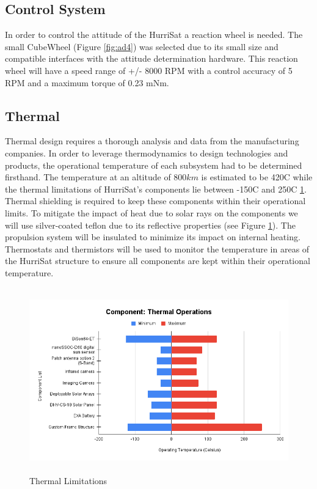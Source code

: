 \subsection{Control System}
In order to control the attitude of the HurriSat a reaction wheel is needed. The small CubeWheel (Figure \ref{fig:ad4}) was selected due to its small size and compatible interfaces with the attitude determination hardware. This reaction wheel will have a speed range of +/- 8000 RPM with a control accuracy of 5 RPM and a maximum torque of 0.23 mNm. 

\subsection{Thermal }
Thermal design requires a thorough analysis and data from the manufacturing companies. In order to leverage thermodynamics to design technologies and products, the operational temperature of each subsystem had to be determined firsthand. The temperature at an altitude of $800km$ is estimated to be 420C while the thermal limitations of HurriSat's components lie between -150C and 250C \ref{fig:thermal}. Thermal shielding is required to keep these components within their operational limits. To mitigate the impact of heat due to solar rays on the components we will use silver-coated teflon due to its reflective properties (see  Figure \ref{fig:thermal}). The propulsion system will be insulated to minimize its impact on internal heating. Thermostats and thermistors will be used to monitor the temperature in areas of the HurriSat structure to ensure all components are kept within their operational temperature.
\begin{figure}[hbt!]
    \centering
    \includegraphics[width=\textwidth,frame, height=8cm]{Images/thermal.png}
    \caption{Thermal Limitations}
    \label{fig:thermal}
\end{figure}
\newpage
